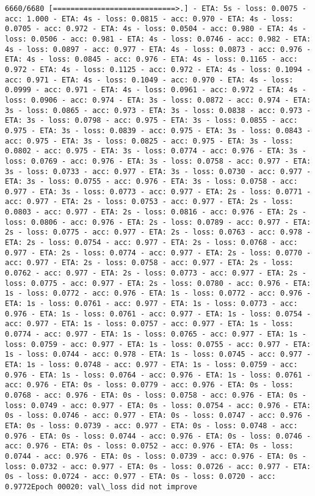 \documentclass[11pt]{article}
\begin{document}
\begin{Verbatim}[commandchars=\\\{\}]
6660/6680 [============================>.] - ETA: 5s - loss: 0.0075 - acc: 1.000 - ETA: 4s - loss: 0.0815 - acc: 0.970 - ETA: 4s - loss: 0.0705 - acc: 0.972 - ETA: 4s - loss: 0.0504 - acc: 0.980 - ETA: 4s - loss: 0.0506 - acc: 0.981 - ETA: 4s - loss: 0.0746 - acc: 0.982 - ETA: 4s - loss: 0.0897 - acc: 0.977 - ETA: 4s - loss: 0.0873 - acc: 0.976 - ETA: 4s - loss: 0.0845 - acc: 0.976 - ETA: 4s - loss: 0.1165 - acc: 0.972 - ETA: 4s - loss: 0.1125 - acc: 0.972 - ETA: 4s - loss: 0.1094 - acc: 0.971 - ETA: 4s - loss: 0.1049 - acc: 0.970 - ETA: 4s - loss: 0.0999 - acc: 0.971 - ETA: 4s - loss: 0.0961 - acc: 0.972 - ETA: 4s - loss: 0.0906 - acc: 0.974 - ETA: 3s - loss: 0.0872 - acc: 0.974 - ETA: 3s - loss: 0.0865 - acc: 0.973 - ETA: 3s - loss: 0.0838 - acc: 0.973 - ETA: 3s - loss: 0.0798 - acc: 0.975 - ETA: 3s - loss: 0.0855 - acc: 0.975 - ETA: 3s - loss: 0.0839 - acc: 0.975 - ETA: 3s - loss: 0.0843 - acc: 0.975 - ETA: 3s - loss: 0.0825 - acc: 0.975 - ETA: 3s - loss: 0.0802 - acc: 0.975 - ETA: 3s - loss: 0.0774 - acc: 0.976 - ETA: 3s - loss: 0.0769 - acc: 0.976 - ETA: 3s - loss: 0.0758 - acc: 0.977 - ETA: 3s - loss: 0.0733 - acc: 0.977 - ETA: 3s - loss: 0.0730 - acc: 0.977 - ETA: 3s - loss: 0.0755 - acc: 0.976 - ETA: 3s - loss: 0.0758 - acc: 0.977 - ETA: 3s - loss: 0.0773 - acc: 0.977 - ETA: 2s - loss: 0.0771 - acc: 0.977 - ETA: 2s - loss: 0.0753 - acc: 0.977 - ETA: 2s - loss: 0.0803 - acc: 0.977 - ETA: 2s - loss: 0.0816 - acc: 0.976 - ETA: 2s - loss: 0.0806 - acc: 0.976 - ETA: 2s - loss: 0.0789 - acc: 0.977 - ETA: 2s - loss: 0.0775 - acc: 0.977 - ETA: 2s - loss: 0.0763 - acc: 0.978 - ETA: 2s - loss: 0.0754 - acc: 0.977 - ETA: 2s - loss: 0.0768 - acc: 0.977 - ETA: 2s - loss: 0.0774 - acc: 0.977 - ETA: 2s - loss: 0.0770 - acc: 0.977 - ETA: 2s - loss: 0.0758 - acc: 0.977 - ETA: 2s - loss: 0.0762 - acc: 0.977 - ETA: 2s - loss: 0.0773 - acc: 0.977 - ETA: 2s - loss: 0.0775 - acc: 0.977 - ETA: 2s - loss: 0.0780 - acc: 0.976 - ETA: 1s - loss: 0.0772 - acc: 0.976 - ETA: 1s - loss: 0.0772 - acc: 0.976 - ETA: 1s - loss: 0.0761 - acc: 0.977 - ETA: 1s - loss: 0.0773 - acc: 0.976 - ETA: 1s - loss: 0.0761 - acc: 0.977 - ETA: 1s - loss: 0.0754 - acc: 0.977 - ETA: 1s - loss: 0.0757 - acc: 0.977 - ETA: 1s - loss: 0.0774 - acc: 0.977 - ETA: 1s - loss: 0.0765 - acc: 0.977 - ETA: 1s - loss: 0.0759 - acc: 0.977 - ETA: 1s - loss: 0.0755 - acc: 0.977 - ETA: 1s - loss: 0.0744 - acc: 0.978 - ETA: 1s - loss: 0.0745 - acc: 0.977 - ETA: 1s - loss: 0.0748 - acc: 0.977 - ETA: 1s - loss: 0.0759 - acc: 0.976 - ETA: 1s - loss: 0.0764 - acc: 0.976 - ETA: 1s - loss: 0.0761 - acc: 0.976 - ETA: 0s - loss: 0.0779 - acc: 0.976 - ETA: 0s - loss: 0.0768 - acc: 0.976 - ETA: 0s - loss: 0.0758 - acc: 0.976 - ETA: 0s - loss: 0.0749 - acc: 0.977 - ETA: 0s - loss: 0.0754 - acc: 0.976 - ETA: 0s - loss: 0.0746 - acc: 0.977 - ETA: 0s - loss: 0.0747 - acc: 0.976 - ETA: 0s - loss: 0.0739 - acc: 0.977 - ETA: 0s - loss: 0.0748 - acc: 0.976 - ETA: 0s - loss: 0.0744 - acc: 0.976 - ETA: 0s - loss: 0.0746 - acc: 0.976 - ETA: 0s - loss: 0.0752 - acc: 0.976 - ETA: 0s - loss: 0.0744 - acc: 0.976 - ETA: 0s - loss: 0.0739 - acc: 0.976 - ETA: 0s - loss: 0.0732 - acc: 0.977 - ETA: 0s - loss: 0.0726 - acc: 0.977 - ETA: 0s - loss: 0.0724 - acc: 0.977 - ETA: 0s - loss: 0.0720 - acc: 0.9772Epoch 00020: val\_loss did not improve

\end{Verbatim}
\end{document}
